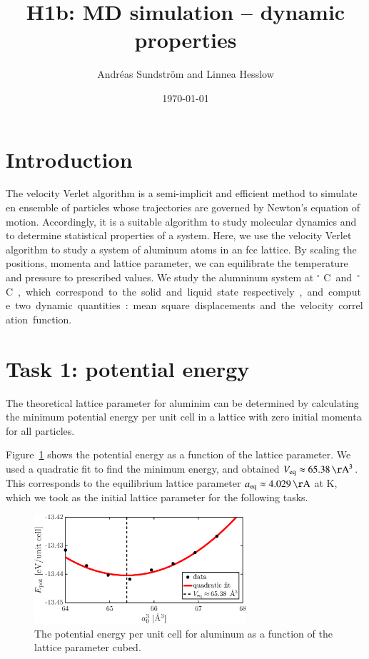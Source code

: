 
\usepackage{units}
\usepackage{physics}

\newcommand{\ee}{\mathrm{e}}
\newcommand{\ii}{\mathrm{i}}

\title{H1b: MD simulation -- dynamic properties}
\author{Andr\'eas Sundstr\"om and Linnea Hesslow}
\date{\today}





\section*{Introduction}

The velocity Verlet algorithm is a semi-implicit and efficient method to simulate en ensemble of particles whose trajectories are governed by Newton's equation of motion. Accordingly, 
it is a suitable algorithm to study molecular dynamics and to determine statistical properties of a system. Here, we use the velocity Verlet algorithm to study a system of aluminum atoms in an fcc lattice. By scaling the positions, momenta and lattice parameter, we can equilibrate the temperature and pressure to prescribed values. We  study the alumninum system at \unit[500]{$^\circ$ C} and \unit[700]{$^\circ$ C}, which correspond to the solid and liquid state respectively, and compute two dynamic quantities:   
mean square displacements and the velocity correlation function. 



\section*{Task 1: potential energy}
The theoretical lattice parameter for aluminim can be determined by calculating the minimum potential energy per unit cell in a lattice with zero initial momenta for all particles. 

Figure~\ref{fig1} shows the potential energy as a function of the lattice parameter. We used a quadratic fit to find the minimum energy, and obtained $V_{\rm eq} \approx \unit[65.38]{\AA^3}$. This corresponds to the equilibrium lattice parameter $a_{\rm eq} \approx \unit[4.029]{\AA}$ at \unit[0]{K}, which we took as the initial lattice parameter for the following tasks.  

\begin{figure}[!ht]
\begin{center}
  \includegraphics[width=0.7\textwidth]{../figures/potential_energy} 
  \caption{The potential energy per unit cell for aluminum as a function of the lattice parameter cubed.}
  \label{fig1}
\end{center}
\end{figure}

